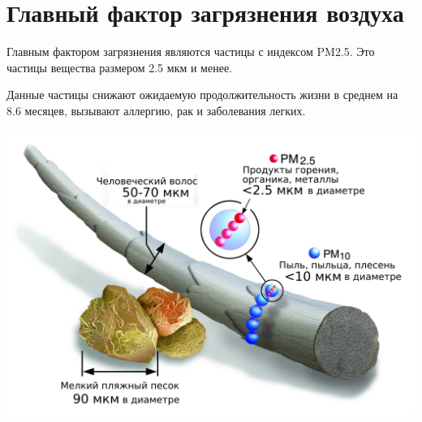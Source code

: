 
\section{Главный фактор загрязнения воздуха}
\begin{frame}{\insertsectionhead}
    \begin{minipage}{0.55\textwidth}
        \footnotesize
        Главным фактором загрязнения являются частицы с индексом
        PM2.5\cite{iqair}. 
        Это частицы вещества размером 2.5 мкм и менее.

        \medskip

        Данные частицы снижают ожидаемую продолжительность жизни 
        в среднем на 8.6 месяцев, вызывают аллергию, рак 
        и заболевания легких.
    \end{minipage}
    \begin{minipage}{0.43\textwidth}
        \hspace{1em}
        \includegraphics[width=\textwidth]{assets/pm25_scale_graphic.jpg}
    \end{minipage}
\end{frame}

